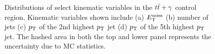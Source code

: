 \begin{figure}[h!]
\begin{center}
\caption[Distributions of select kinematic variables in the $\ttbar+\gamma$ control region]{ Distributions of select kinematic variables in the $\ttbar+\gamma$ control region. Kinematic variables shown include (a) $E_{\mathrm{T}}^{\mathrm{miss}}$ (b) number of jets (c) $p_{\mathrm{T}}$ of the 2nd highest $p_{\mathrm{T}}$ jet (d) $p_{\mathrm{T}}$ of the 5th highest $p_{\mathrm{T}}$ jet. The hashed area in both the top and lower panel represents the uncertainty due to MC statistics.}
\label{fig:ttgamma}
\end{center}
\end{figure}





